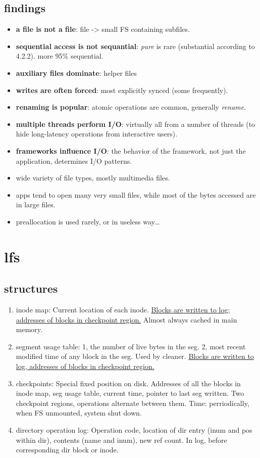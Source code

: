 \documentclass[9pt,conference]{IEEEtran}
\begin{document}
\subsection{findings}
\label{sec-5-1}
\begin{itemize}
\item \textbf{a file is not a file}: file -> small FS containing subfiles.
\item \textbf{sequential access is not sequantial}: \emph{pure} is rare (substantial according to 4.2.2). more 95\% sequential.
\item \textbf{auxiliary files dominate}: helper files
\item \textbf{writes are often forced}: most explicitly synced (some frequently).
\item \textbf{renaming is popular}: atomic operations are common, generally \emph{rename}.
\item \textbf{multiple threads perform I/O}: virtually all from a number of threads (to hide long-latency operations from interactive users).
\item \textbf{frameworks influence I/O}: the behavior of the framework, not just the application, determines I/O patterns.
\item wide variety of file types, mostly multimedia files.
\item apps tend to open many very small files, while most of the bytes accessed are in large files.
\item preallocation is used rarely, or in useless way\ldots{}
\end{itemize}

\section{lfs}
\label{sec-6}
\subsection{structures}
\label{sec-6-1}
\begin{enumerate}
\item inode map:
\label{sec-6-1-1}
Current location of each inode.
\uline{Blocks are written to log; addresses of blocks in checkpoint region.}
Almost always cached in main memory.
\item segment usage table:
\label{sec-6-1-2}
1, the number of live bytes in the seg.
2, most recent modified time of any block in the seg.
Used by cleaner.
\uline{Blocks are written to log, addresses of blocks in checkpoint region.}
\item checkpoints:
\label{sec-6-1-3}
Special fixed position on disk.
Addresses of all the blocks in inode map, seg usage table, current time, pointer to last seg written.
Two checkpoint regions, operations alternate between them.
Time: perriodically, when FS unmounted, system shut down.
\item directory operation log:
\label{sec-6-1-4}
Operation code, location of dir entry (inum and pos within dir), contents (name and inum), new ref count.
In log, before corresponding dir block or inode.
\end{enumerate}
\end{document}
